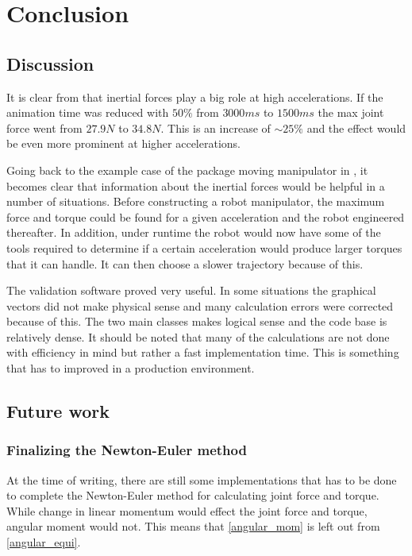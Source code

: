 \chapter{Conclusion}

\section{Discussion}

It is clear from  that inertial forces play a big role at high accelerations. If the animation time was reduced with $50\%$ from $3000ms$ to $1500ms$ the max joint force went from $27.9N$ to $34.8N$. This is an increase of $\sim 25\%$ and the effect would be even more prominent at higher accelerations.

Going back to the example case of the package moving manipulator in , it becomes clear that information about the inertial forces would be helpful in a number of situations. Before constructing a robot manipulator, the maximum force and torque could be found for a given acceleration and the robot engineered thereafter. In addition, under runtime the robot would now have some of the tools required to determine if a certain acceleration would produce larger torques that it can handle. It can then choose a slower trajectory because of this.

The validation software proved very useful. In some situations the graphical vectors did not make physical sense and many calculation errors were corrected because of this. The two main classes makes logical sense and the code base is relatively dense. It should be noted that many of the calculations are not done with efficiency in mind but rather a fast implementation time. This is something that has to improved in a production environment.

\section{Future work}

\subsection{Finalizing the Newton-Euler method}
At the time of writing, there are still some implementations that has to be done to complete the Newton-Euler method for calculating joint force and torque. While change in linear momentum would effect the joint force and torque, angular moment would not. This means that \eqref{angular_mom} is left out from \eqref{angular_equi}.


